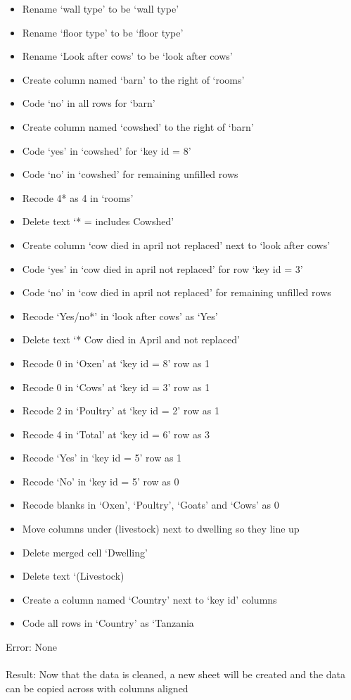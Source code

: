 \documentclass{article}
\begin{document}
\begin{itemize}
\item Rename ‘wall type’ to be ‘wall type’
\item Rename ‘floor type’ to be ‘floor type’
\item Rename ‘Look after cows’ to be ‘look after cows’
\item Create column named ‘barn’ to the right of ‘rooms’
\item Code ‘no’ in all rows for ‘barn’
\item Create column named ‘cowshed’ to the right of ‘barn’
\item Code ‘yes’ in ‘cowshed’ for ‘key id = 8’
\item Code ‘no’ in ‘cowshed’ for remaining unfilled rows
\item Recode 4* as 4 in ‘rooms’
\item Delete text ‘* = includes Cowshed’
\item Create column ‘cow died in april not replaced’ next to ‘look after cows’
\item Code ‘yes’ in ‘cow died in april not replaced’ for row ‘key id = 3’
\item Code ‘no’ in ‘cow died in april not replaced’ for remaining unfilled rows
\item Recode ‘Yes/no*’ in ‘look after cows’ as ‘Yes’
\item Delete text ‘* Cow died in April and not replaced’
\item Recode 0 in ‘Oxen’ at ‘key id = 8’ row as 1
\item Recode 0 in ‘Cows’ at ‘key id = 3’ row as 1
\item Recode 2 in ‘Poultry’ at ‘key id = 2’ row as 1
\item Recode 4 in ‘Total’ at ‘key id = 6’ row as 3
\item Recode ‘Yes’ in ‘key id = 5’ row as 1
\item Recode ‘No’ in ‘key id = 5’ row as 0
\item Recode blanks in ‘Oxen’, ‘Poultry’, ‘Goats’ and ‘Cows’ as 0
\item Move columns under (livestock) next to dwelling so they line up
\item Delete merged cell ‘Dwelling’
\item Delete text ‘(Livestock)
\item Create a column named ‘Country’ next to ‘key id’ columns
\item Code all rows in ‘Country’ as ‘Tanzania
\end{itemize}
Error: None \\\\
Result: Now that the data is cleaned, a new sheet will be created and the data can be copied across with columns aligned 
\end{document}
